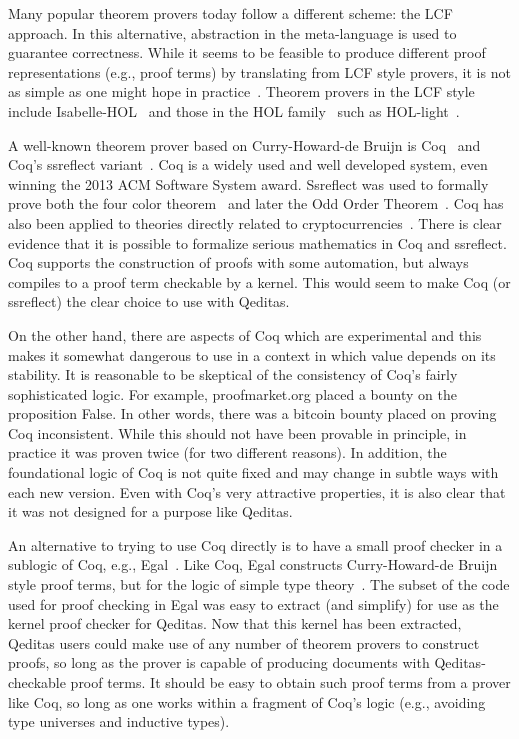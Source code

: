 \documentclass{article}
\begin{document}
Many popular theorem provers today follow a different scheme: the LCF
approach. In this alternative, abstraction in the meta-language is used to guarantee correctness.
While it seems to be feasible to produce different proof representations (e.g., proof terms) by
translating from LCF style provers, it is
not as simple as one might hope in practice~\cite{ckak-itp13,ckju-cade13}. Theorem provers in the
LCF style include Isabelle-HOL~\cite{Nipkow-Paulson-Wenzel:2002} and those in the HOL family~\cite{Gordon91} such as
HOL-light~\cite{harrison-hollight}.

A well-known theorem prover based on Curry-Howard-de Bruijn is Coq~\cite{Coq:manual,BC04,chlipalacpdt2011,Pierce:SF}
and Coq's ssreflect variant~\cite{Gonthier2010}. Coq is a widely used and well developed system,
even winning the 2013 ACM Software System award. Ssreflect was used to formally prove both the four color theorem~\cite{Gonthier2007} and later the
Odd Order Theorem~\cite{Gonthier2013}. Coq has also been applied to theories directly related
to cryptocurrencies~\cite{Miller2014gpads,multibranch,multistrategy,White2015a,White2015b}. There is clear evidence that it is possible
to formalize serious mathematics in Coq and ssreflect. Coq supports the construction of proofs with some automation, but always compiles to a proof term
checkable by a kernel. This would seem to make Coq (or ssreflect) the clear
choice to use with Qeditas.

On the other hand, there are aspects of Coq which are experimental and
this makes it somewhat dangerous to use in a context in which value depends
on its stability. It is reasonable to be skeptical of the consistency of Coq's
fairly sophisticated logic. For example, proofmarket.org placed a bounty on
the proposition False. In other words, there was a bitcoin bounty placed on
proving Coq inconsistent. While this should not have been provable in principle,
in practice it was proven twice (for two different reasons). In addition, the
foundational logic of Coq is not quite fixed and may change in subtle ways with
each new version. Even with Coq's very attractive properties, it is also clear
that it was not designed for a purpose like Qeditas.

An alternative to trying to use Coq directly is to have
a small proof checker in a sublogic of Coq, e.g., Egal~\cite{Brown2014}. Like Coq, Egal constructs
Curry-Howard-de Bruijn style proof terms, but for the logic of simple type theory~\cite{Church40}.
The subset of the code used for proof checking in Egal
was easy to extract (and simplify) for use as the
kernel proof checker for Qeditas. Now that this kernel has been
extracted, Qeditas users could make use of any number of
theorem provers to construct proofs, so long as the prover
is capable of producing documents with Qeditas-checkable proof terms.
It should be easy to obtain such proof terms from a prover like Coq,
so long as one works within a fragment of Coq's logic (e.g., avoiding
type universes and inductive types).
\end{document}
